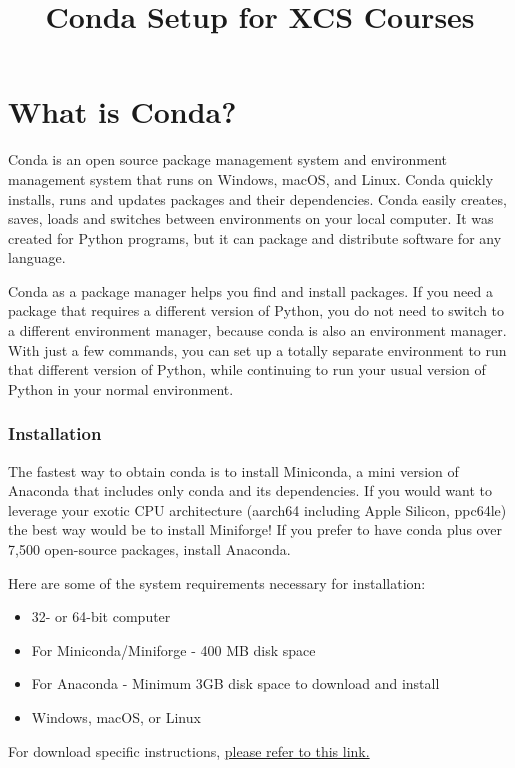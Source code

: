 \documentclass{article}
\begin{document}
\title{Conda Setup for XCS Courses}
\date{}
\maketitle


\part*{What is Conda?}

Conda is an open source package management system and environment management system that runs on Windows, macOS, and Linux. Conda quickly installs, runs and updates packages and their dependencies. Conda easily creates, saves, loads and switches between environments on your local computer. It was created for Python programs, but it can package and distribute software for any language. 

Conda as a package manager helps you find and install packages. If you need a package that requires a different version of Python, you do not need to switch to a different environment manager, because conda is also an environment manager. With just a few commands, you can set up a totally separate environment to run that different version of Python, while continuing to run your usual version of Python in your normal environment.

\section{Installation}

The fastest way to obtain conda is to install Miniconda, a mini version of Anaconda that includes only conda and its dependencies. If you would want to leverage your exotic CPU architecture (aarch64 including Apple Silicon, ppc64le) the best way would be to install Miniforge! If you prefer to have conda plus over 7,500 open-source packages, install Anaconda. 

Here are some of the system requirements necessary for installation:
\begin{itemize}
  \item 32- or 64-bit computer
  \item For Miniconda/Miniforge - 400 MB disk space
  \item For Anaconda - Minimum 3GB disk space to download and install
  \item Windows, macOS, or Linux
\end{itemize}

For download specific instructions, \href{https://docs.conda.io/projects/conda/en/latest/user-guide/install/index.html}{please refer to this link.}
\end{document}
